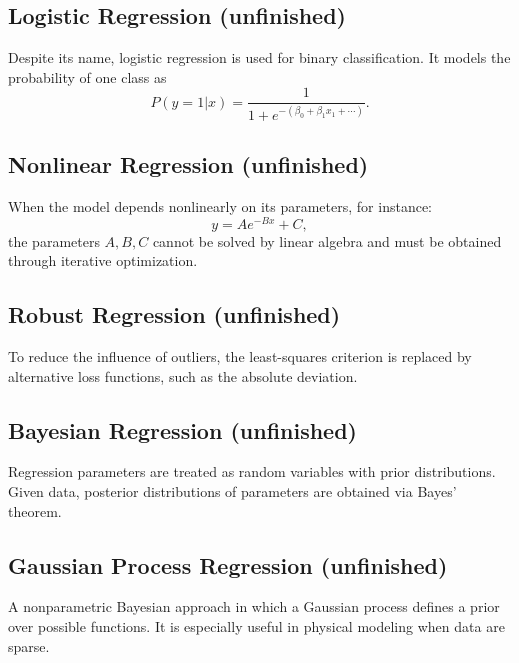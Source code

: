 \documentclass[../../../main.tex]{subfiles}
\begin{document}
\subsection{Logistic Regression (unfinished)}
Despite its name, logistic regression is used for binary classification.
It models the probability of one class as
\begin{equation*}
    P(y=1|x) = \frac{1}{1 + e^{-(\beta_0 + \beta_1 x_1 + \cdots)}}.
\end{equation*}

\subsection{Nonlinear Regression (unfinished)}
When the model depends nonlinearly on its parameters, for instance:
\begin{equation*}
    y = A e^{-Bx} + C,
\end{equation*}
the parameters \( A, B, C \) cannot be solved by linear algebra and must be obtained through iterative optimization.

\subsection{Robust Regression (unfinished)}
To reduce the influence of outliers, the least-squares criterion is replaced by alternative loss functions, such as the absolute deviation.

\subsection{Bayesian Regression (unfinished)}
Regression parameters are treated as random variables with prior distributions.
Given data, posterior distributions of parameters are obtained via Bayes' theorem.

\subsection{Gaussian Process Regression (unfinished)}
A nonparametric Bayesian approach in which a Gaussian process defines a prior over possible functions.
It is especially useful in physical modeling when data are sparse.
\end{document}
